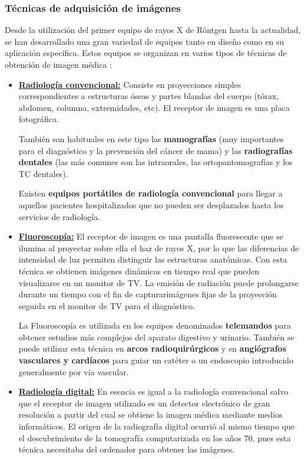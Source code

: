 \subsubsection{Técnicas de adquisición de imágenes}
Desde la utilización del primer equipo de rayos X de Röntgen hasta la actualidad, se han desarrollado una gran variedad de equipos tanto en diseño como en su aplicación específica. Estos equipos se organizan en varios tipos de técnicas de obtención de imagen médica \cite{7} \cite{8}:
\begin{itemize}
\item \textbf{\underline{Radiología convencional:}} Consiste en proyecciones simples correspondientes a estructuras óseas y partes blandas del cuerpo (tórax, abdomen, columna, extremidades, etc). El receptor de imagen es una placa fotográfica. 

También son habituales en este tipo las \textbf{mamografías} (muy importantes para el diagnóstico y la prevención del cáncer de mama) y las \textbf{radiografías dentales} (las más comunes son las intraorales, las ortopantomografías y los TC dentales). 

Existen \textbf{equipos portátiles de radiología convencional} para llegar a aquellos pacientes hospitalizados que no pueden ser desplazados hasta los servicios de radiología.

\item \textbf{\underline{Fluoroscopía:}} El receptor de imagen es una pantalla fluorescente que se ilumina al proyectar sobre ella el haz de rayos X, por lo que las diferencias de intensidad de luz permiten distinguir las estructuras anatómicas. Con esta técnica se obtienen imágenes dinámicas en tiempo real que pueden visualizarse en un monitor de TV. La emisión de radiación puede prolongarse durante un tiempo con el fin de capturarimágenes fijas de la proyección seguida en el monitor de TV para el diagnóstico.

La Fluoroscopía es utilizada en los equipos denominados \textbf{telemandos} para obtener estudios más complejos del aparato digestivo y urinario. También se puede utilizar esta técnica en \textbf{arcos radioquirúrgicos} y en \textbf{angiógrafos vasculares y cardíacos} para guiar un catéter o un endoscopio introducido generalmente por vía vascular.

\item \textbf{\underline{Radiología digital:}} En esencia es igual a la radiología convencional salvo que el receptor de imagen utilizado es un detector electrónico de gran resolución a partir del cual se obtiene la imagen médica mediante medios informáticos. El origen de la radiografía digital ocurrió al mismo tiempo que el descubrimiento de la tomografía computarizada en los años 70, pues esta técnica necesitaba del ordenador para obtener las imágenes.


\end{itemize}
